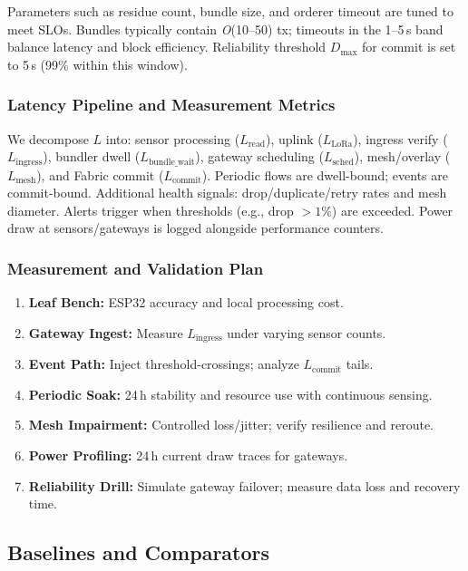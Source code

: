 \documentclass[12pt,onecolumn]{IEEEtran} %
\begin{document}
Parameters such as residue count, bundle size, and orderer timeout are tuned to meet SLOs. Bundles typically contain \emph{O}(10–50) tx; timeouts in the 1–5\,s band balance latency and block efficiency. Reliability threshold $D_{\max}$ for commit is set to 5\,s (99\% within this window).

\subsubsection{Latency Pipeline and Measurement Metrics}
\label{subsubsec:latency-pipeline}

We decompose $L$ into: sensor processing ($L_{\text{read}}$), uplink ($L_{\text{LoRa}}$), ingress verify ($L_{\text{ingress}}$), bundler dwell ($L_{\text{bundle\_wait}}$), gateway scheduling ($L_{\text{sched}}$), mesh/overlay ($L_{\text{mesh}}$), and Fabric commit ($L_{\text{commit}}$). Periodic flows are dwell-bound; events are commit-bound. Additional health signals: drop/duplicate/retry rates and mesh diameter. Alerts trigger when thresholds (e.g., drop $>1\%$) are exceeded. Power draw at sensors/gateways is logged alongside performance counters.

\subsubsection{Measurement and Validation Plan}
\label{subsubsec:measurement-plan}

\begin{enumerate}
    \item \textbf{Leaf Bench:} ESP32 accuracy and local processing cost.
    \item \textbf{Gateway Ingest:} Measure $L_{\text{ingress}}$ under varying sensor counts.
    \item \textbf{Event Path:} Inject threshold-crossings; analyze $L_{\text{commit}}$ tails.
    \item \textbf{Periodic Soak:} 24\,h stability and resource use with continuous sensing.
    \item \textbf{Mesh Impairment:} Controlled loss/jitter; verify resilience and reroute.
    \item \textbf{Power Profiling:} 24\,h current draw traces for gateways.
    \item \textbf{Reliability Drill:} Simulate gateway failover; measure data loss and recovery time.
\end{enumerate}

\subsection{Baselines and Comparators}
\label{subsec:baselines}
\end{document}
